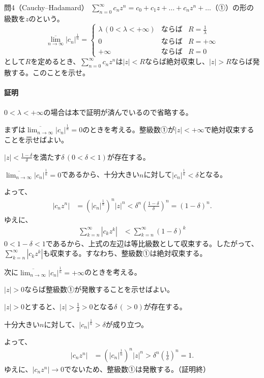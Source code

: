 \begin{mysimplebox}{問4（Cauchy--Hadamard）}
    $\sum_{n=0}^\infty c_nz^n=c_0+c_1z+\dots+c_nz^n+\dots$（①）の形の級数を$z$のという。
    \[\overline{\lim_{n\to\infty}}|c_n|^{\frac{1}{n}}=\left\{\begin{array}{lll}
      \lambda  \,(0<\lambda<+\infty) & \mbox{ならば} & R=\frac{1}{\lambda}\\
      0 & \mbox{ならば} & R=+\infty\\
      +\infty & \mbox{ならば} & R=0
    \end{array}\right.\]
    として$R$を定めるとき、$\sum_{n=0}^\infty c_nz^n$は$|z|<R$ならば絶対収束し、$|z|>R$ならば発散する。このことを示せ。
\end{mysimplebox}
\paragraph{証明}
$0<\lambda<+\infty$の場合は本で証明が済んでいるので省略する。

まずは$\displaystyle\overline{\lim_{n\to\infty}}|c_n|^{\frac{1}{n}}=0$のときを考える。整級数①が$|z|<+\infty$で絶対収束することを示せばよい。

$|z|<\frac{1-\delta}{\delta}$を満たす$\delta\,(0<\delta<1)$が存在する。

$\displaystyle\overline{\lim_{n\to\infty}}|c_n|^{\frac{1}{n}}=0$であるから、十分大きい$n$に対して$|c_n|^\frac{1}{n}<\delta$となる。

よって、
\begin{align*}
    |c_nz^n|&=\left(|c_n|^\frac{1}{n}\right)^n|z|^n<\delta^n\left(\frac{1-\delta}{\delta}\right)^n
    =(1-\delta)^n.
\end{align*}
ゆえに、
\begin{align*}
    \sum_{k=n}^\infty |c_kz^k|&<\sum_{k=n}^\infty(1-\delta)^k
\end{align*}
$0<1-\delta<1$であるから、上式の左辺は等比級数として収束する。したがって、$\sum_{k=n}^\infty |c_kz^k|$も収束する。すなわち、整級数①は絶対収束する。

次に$\displaystyle\overline{\lim_{n\to\infty}}|c_n|^{\frac{1}{n}}=+\infty$のときを考える。

$|z|>0$ならば整級数①が発散することを示せばよい。

$|z|>0$とすると、$|z|>\frac{1}{\delta}>0$となる$\delta\,(>0)$が存在する。

十分大きい$n$に対して、$|c_n|^\frac{1}{n}>\delta$が成り立つ。

よって、
\begin{align*}
    |c_nz^n|&=\left(|c_n|^\frac{1}{n}\right)^n|z|^n>\delta^n\left(\frac{1}{\delta}\right)^n
    =1.
\end{align*}
ゆえに、$|c_nz^n|\to 0$でないため、整級数①は発散する。（証明終）

